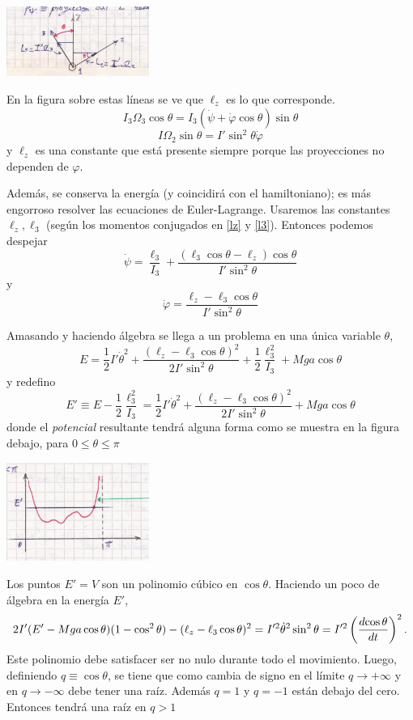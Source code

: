 \documentclass[10pt,oneside]{CBFT_book}
\begin{document}
\includegraphics[width=0.35\textwidth]{images/fig_mc_peonza_segunda_4.jpg}

En la figura sobre estas líneas se ve que $\ell_z$ es lo que corresponde.
\[
	I_3 \Omega_3 \cos \theta = I_3 ( \dot{\psi} + \dot{\varphi} \cos \theta )\sin \theta
\]
\[
	I \Omega_2 \sin \theta = I' \sin^2 \theta \dot{ \varphi }
\]
y $\ell_z$ es una constante que está presente siempre porque las proyecciones no dependen de $\varphi$.

Además, se conserva la energía (y coincidirá con el hamiltoniano); es más engorroso resolver las
ecuaciones de Euler-Lagrange.
Usaremos las constantes $\ell_z,\ell_3$ (según los momentos conjugados en \eqref{lz} y \eqref{l3}).
Entonces podemos despejar
\[
	\dot{\psi} = \frac{\ell_3}{I_3} + \frac{(\ell_3 \cos\theta - \ell_z)\cos\theta}{I'\sin^2\theta}
\]
y
\[
	\dot{\varphi} = \frac{\ell_z - \ell_3 \cos \theta}{I'\sin^2\theta}
\]

Amasando y haciendo álgebra se llega a un problema en una única variable $\theta$,
\[
	E = \frac 1 2 I' \dot{\theta}^2 + \frac{(\ell_z - \ell_3 \cos \theta)^2}{2I'\sin^2\theta} +
	\frac{1}{2}\frac{\ell_3^2}{I_3} + M g a \cos\theta
\]
y redefino
\[
	E' \equiv E - \frac{1}{2} \frac{\ell_3^2}{I_3} = 
	\frac 1 2 I' \dot{\theta}^2 + \frac{(\ell_z - \ell_3 \cos \theta)^2}{2I'\sin^2\theta} + M g a \cos\theta
\]
donde el {\it potencial} resultante tendrá alguna forma como se muestra en la figura debajo, para $0 \leq \theta \leq \pi$

\includegraphics[width=0.35\textwidth]{images/fig_mc_peonza_segunda_5.jpg}

Los puntos $E'=V$ son un polinomio cúbico en $\cos\theta$. 
Haciendo un poco de álgebra en la energía $E'$,
\[
	2I'(E'- Mga\cos\theta)(1-\cos^2\theta) - (\ell_z - \ell_3 \cos \theta)^2 =
	I'^2 \dot{\theta}^2 \sin^2\theta = I'^2 \left( \frac{d^{\hspace{-0.05em}} {\cos\theta}}{d {t}^{\hspace{-0.05em}}} \right)^2. 
\]
Este polinomio debe satisfacer ser no nulo durante todo el movimiento. Luego, definiendo
$q\equiv \cos\theta$, se tiene que como cambia de signo en el límite $q\to +\infty$ y en $q\to -\infty$
debe tener una raíz. Además $q=1$ y $q=-1$ están debajo del cero.
Entonces tendrá una raíz en $q>1$
\end{document}
